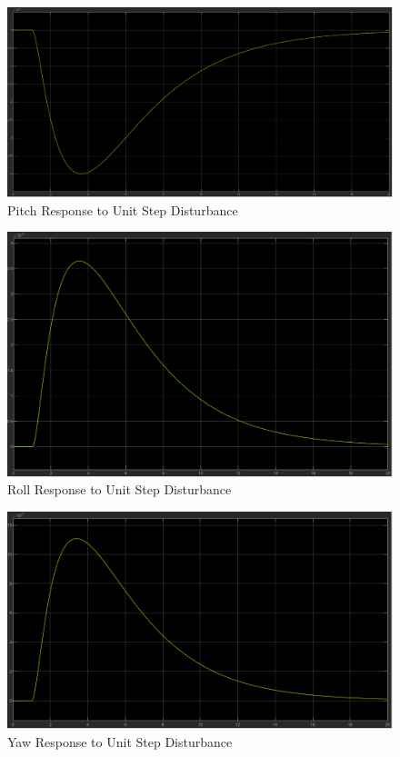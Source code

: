 \documentclass[12pt]{article}
\begin{document}
\begin{figure}[h]
\includegraphics[width=0.9\linewidth]{images/Pitch_response.png}
\centering
\caption{Pitch Response to Unit Step Disturbance}
\end{figure}

\begin{figure}[h]
\includegraphics[width=0.9\linewidth]{images/Roll_response.png}
\centering
\caption{Roll Response to Unit Step Disturbance}
\end{figure}

\begin{figure}[h]
\includegraphics[width=0.9\linewidth]{images/Yaw_response.png}
\centering
\caption{Yaw Response to Unit Step Disturbance}
\end{figure}
\end{document}
